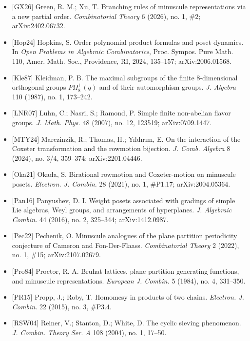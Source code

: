 \documentclass[
]{article}
\begin{document}
\begin{itemize}
  {[}Gre13{]} Green, R. M. \emph{Combinatorics of Minuscule
  Representations.} Cambridge Tracts in Mathematics 199, Cambridge
  University Press, 2013.
\item
  {[}GX26{]} Green, R. M.; Xu, T. Branching rules of minuscule
  representations via a new partial order. \emph{Combinatorial Theory} 6
  (2026), no. 1, \#2; arXiv:2402.06732.
\item
  {[}Hop24{]} Hopkins, S. Order polynomial product formulas and poset
  dynamics. In \emph{Open Problems in Algebraic Combinatorics}, Proc.
  Sympos. Pure Math. 110, Amer. Math. Soc., Providence, RI, 2024,
  135--157; arXiv:2006.01568.
\item
  {[}Kle87{]} Kleidman, P. B. The maximal subgroups of the finite
  8-dimensional orthogonal groups \(P\Omega_8^+(q)\) and of their
  automorphism groups. \emph{J. Algebra} 110 (1987), no. 1, 173--242.
\item
  {[}LNR07{]} Luhn, C.; Nasri, S.; Ramond, P. Simple finite non-abelian
  flavor groups. \emph{J. Math. Phys.} 48 (2007), no. 12, 123519;
  arXiv:0709.1447.
\item
  {[}MTY24{]} Marczinzik, R.; Thomas, H.; Yıldırım, E. On the
  interaction of the Coxeter transformation and the rowmotion bijection.
  \emph{J. Comb. Algebra} 8 (2024), no. 3/4, 359--374; arXiv:2201.04446.
\item
  {[}Oka21{]} Okada, S. Birational rowmotion and Coxeter-motion on
  minuscule posets. \emph{Electron. J. Combin.} 28 (2021), no. 1,
  \#P1.17; arXiv:2004.05364.
\item
  {[}Pan16{]} Panyushev, D. I. Weight posets associated with gradings of
  simple Lie algebras, Weyl groups, and arrangements of hyperplanes.
  \emph{J. Algebraic Combin.} 44 (2016), no. 2, 325--344;
  arXiv:1412.0987.
\item
  {[}Pec22{]} Pechenik, O. Minuscule analogues of the plane partition
  periodicity conjecture of Cameron and Fon-Der-Flaass.
  \emph{Combinatorial Theory} 2 (2022), no. 1, \#15; arXiv:2107.02679.
\item
  {[}Pro84{]} Proctor, R. A. Bruhat lattices, plane partition generating
  functions, and minuscule representations. \emph{European J. Combin.} 5
  (1984), no. 4, 331--350.
\item
  {[}PR15{]} Propp, J.; Roby, T. Homomesy in products of two chains.
  \emph{Electron. J. Combin.} 22 (2015), no. 3, \#P3.4.
\item
  {[}RSW04{]} Reiner, V.; Stanton, D.; White, D. The cyclic sieving
  phenomenon. \emph{J. Combin. Theory Ser. A} 108 (2004), no. 1, 17--50.

\end{itemize}
\end{document}
